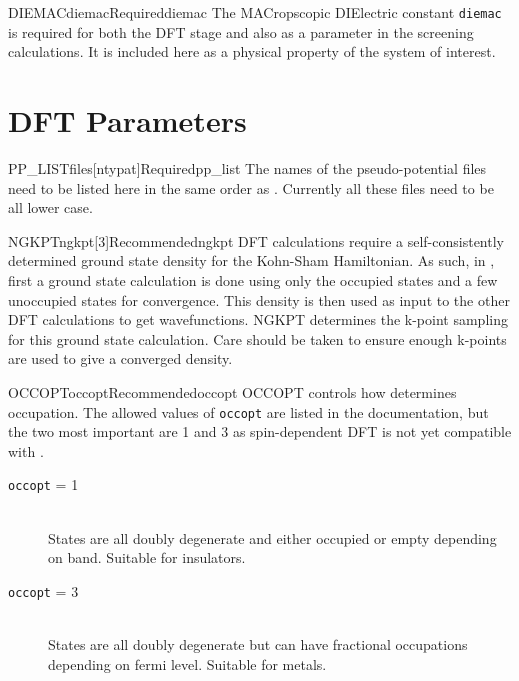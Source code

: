 \documentclass[11pt]{report}
\begin{document}
\begin{Card}{DIEMAC}{diemac}{Required}{diemac}
The MACropscopic DIElectric constant \texttt{diemac} is required for both the DFT stage and also as a parameter in the screening calculations. It is included here as a physical property of the system of interest.
\end{Card}

\section{DFT Parameters}
\label{sec:DFT-Parameters}

\begin{Card}{PP\_LIST}{files[ntypat]}{Required}{pp_list}
The names of the pseudo-potential files need to be listed here in the same order as . Currently all these files need to be all lower case.
\end{Card}

\begin{Card}{NGKPT}{ngkpt[3]}{Recommended}{ngkpt}
DFT calculations require a self-consistently determined ground state density for the Kohn-Sham Hamiltonian. As such, in \OCEAN{}, first a ground state calculation is done using only the occupied states and a few unoccupied states for convergence. This density is then used as input to the other DFT calculations to get wavefunctions. NGKPT determines the k-point sampling for this ground state calculation. Care should be taken to ensure enough k-points are used to give a converged density.
\end{Card}

\begin{Card}{OCCOPT}{occopt}{Recommended}{occopt}
OCCOPT controls how  determines occupation. The allowed values of \texttt{occopt} are listed in the  documentation, but the two most important are 1 and 3 as spin-dependent DFT is not yet compatible with \OCEAN{}.
\begin{description}
\item[\texttt{occopt} = 1]\hfill\\ States are all doubly degenerate and either occupied or empty depending on band. Suitable for insulators.
\item[\texttt{occopt} = 3]\hfill\\ States are all doubly degenerate but can have fractional occupations depending on fermi level. Suitable for metals.
\end{description}
\end{Card}
\end{document}
